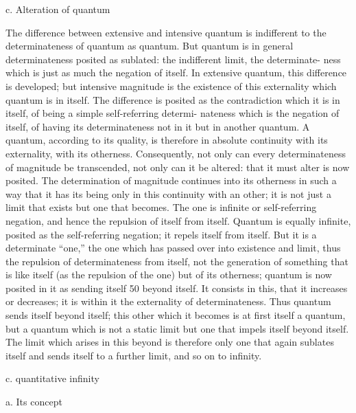 c. Alteration of quantum

The difference between extensive and intensive quantum is indifferent to
the determinateness of quantum as quantum. But quantum is in general
determinateness posited as sublated: the indifferent limit, the determinate-
ness which is just as much the negation of itself. In extensive quantum,
this difference is developed; but intensive magnitude is the existence of
this externality which quantum is in itself. The difference is posited as the
contradiction which it is in itself, of being a simple self-referring determi-
nateness which is the negation of itself, of having its determinateness not
in it but in another quantum.
A quantum, according to its quality, is therefore in absolute continuity
with its externality, with its otherness. Consequently, not only can every
determinateness of magnitude be transcended, not only can it be altered:
that it must alter is now posited. The determination of magnitude continues
into its otherness in such a way that it has its being only in this continuity
with an other; it is not just a limit that exists but one that becomes.
The one is infinite or self-referring negation, and hence the repulsion of
itself from itself. Quantum is equally infinite, posited as the self-referring
negation; it repels itself from itself. But it is a determinate “one,” the
one which has passed over into existence and limit, thus the repulsion
of determinateness from itself, not the generation of something that is
like itself (as the repulsion of the one) but of its otherness; quantum is
now posited in it as sending itself 50 beyond itself. It consists in this, that it
increases or decreases; it is within it the externality of determinateness.
Thus quantum sends itself beyond itself; this other which it becomes
is at first itself a quantum, but a quantum which is not a static limit but
one that impels itself beyond itself. The limit which arises in this beyond
is therefore only one that again sublates itself and sends itself to a further
limit, and so on to infinity.

c. quantitative infinity

a. Its concept

